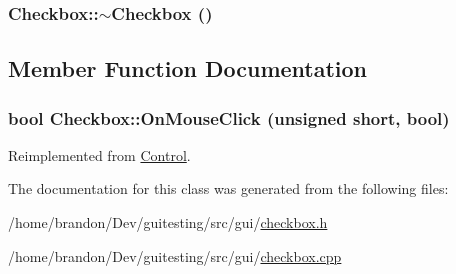 \hypertarget{class_checkbox_828c1436e32c8be0d9d395286d8e6bfe}{
\subsubsection[{$\sim$Checkbox}]{\setlength{\rightskip}{0pt plus 5cm}Checkbox::$\sim$Checkbox ()}}
\label{class_checkbox_828c1436e32c8be0d9d395286d8e6bfe}




\subsection{Member Function Documentation}
\hypertarget{class_checkbox_d017a9602388bab021f25aa502a2f81f}{
\subsubsection[{OnMouseClick}]{\setlength{\rightskip}{0pt plus 5cm}bool Checkbox::OnMouseClick (unsigned short, \/  bool)}}
\label{class_checkbox_d017a9602388bab021f25aa502a2f81f}




Reimplemented from \hyperlink{class_control_1a32f38d1f66f764e6e3a5d8de42d0e0}{Control}.

The documentation for this class was generated from the following files:\begin{CompactItemize}
\item 
/home/brandon/Dev/guitesting/src/gui/\hyperlink{checkbox_8h}{checkbox.h}\item 
/home/brandon/Dev/guitesting/src/gui/\hyperlink{checkbox_8cpp}{checkbox.cpp}\end{CompactItemize}
